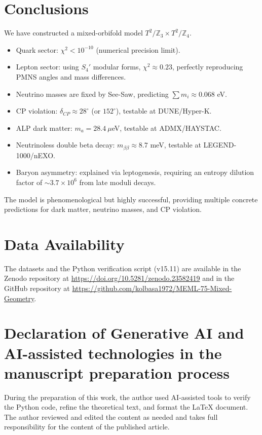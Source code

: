 \documentclass[12pt,a4paper]{article}
\numberwithin{equation}{section}
\begin{document}
\section{Conclusions}
We have constructed a mixed-orbifold model \(T^2/\mathbb{Z}_3 \times T^2/\mathbb{Z}_4\).
\begin{itemize}
\item Quark sector: \(\chi^2 < 10^{-10}\) (numerical precision limit).
\item Lepton sector: using \(S_4'\) modular forms, \(\chi^2 \approx 0.23\), perfectly reproducing PMNS angles and mass differences.
\item Neutrino masses are fixed by See-Saw, predicting \(\sum m_i \approx 0.068\) eV.
\item CP violation: \(\delta_{CP} \approx 28^\circ\) (or \(152^\circ\)), testable at DUNE/Hyper-K.
\item ALP dark matter: \(m_a = 28.4~\mu\)eV, testable at ADMX/HAYSTAC.
\item Neutrinoless double beta decay: \(m_{\beta\beta} \approx 8.7\) meV, testable at LEGEND-1000/nEXO.
\item Baryon asymmetry: explained via leptogenesis, requiring an entropy dilution factor of \(\sim 3.7 \times 10^6\) from late moduli decays.
\end{itemize}
The model is phenomenological but highly successful, providing multiple concrete predictions for dark matter, neutrino masses, and CP violation.


\section*{Data Availability}
The datasets and the Python verification script (v15.11) are available in the Zenodo repository at \url{https://doi.org/10.5281/zenodo.23582419} and in the GitHub repository at \url{https://github.com/kolbasa1972/MEML-75-Mixed-Geometry}.

\section*{Declaration of Generative AI and AI-assisted technologies in the manuscript preparation process}
During the preparation of this work, the author used AI-assisted tools to verify the Python code, refine the theoretical text, and format the LaTeX document. The author reviewed and edited the content as needed and takes full responsibility for the content of the published article.
\end{document}
